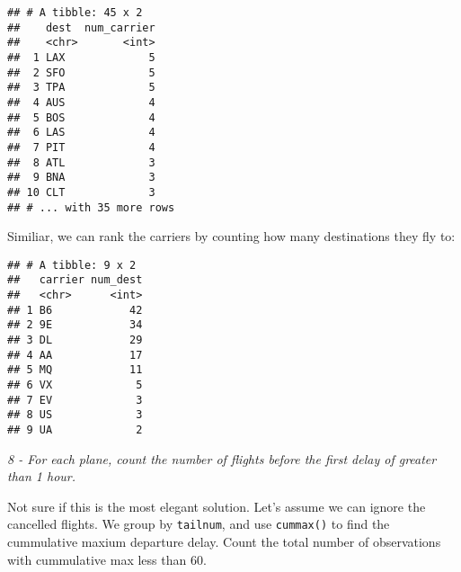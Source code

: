 \documentclass[]{article}
\newenvironment{Shaded}{\begin{snugshade}}{\end{snugshade}}
\newcommand{\KeywordTok}[1]{\textcolor[rgb]{0.13,0.29,0.53}{\textbf{#1}}}
\newcommand{\DataTypeTok}[1]{\textcolor[rgb]{0.13,0.29,0.53}{#1}}
\newcommand{\DecValTok}[1]{\textcolor[rgb]{0.00,0.00,0.81}{#1}}
\newcommand{\StringTok}[1]{\textcolor[rgb]{0.31,0.60,0.02}{#1}}
\newcommand{\OperatorTok}[1]{\textcolor[rgb]{0.81,0.36,0.00}{\textbf{#1}}}
\newcommand{\NormalTok}[1]{#1}
\theoremstyle{definition}
\theoremstyle{definition}
\theoremstyle{definition}
\theoremstyle{remark}
\begin{document}
\begin{verbatim}
## # A tibble: 45 x 2
##    dest  num_carrier
##    <chr>       <int>
##  1 LAX             5
##  2 SFO             5
##  3 TPA             5
##  4 AUS             4
##  5 BOS             4
##  6 LAS             4
##  7 PIT             4
##  8 ATL             3
##  9 BNA             3
## 10 CLT             3
## # ... with 35 more rows
\end{verbatim}

Similiar, we can rank the carriers by counting how many destinations
they fly to:

\begin{Shaded}
\end{Shaded}

\begin{verbatim}
## # A tibble: 9 x 2
##   carrier num_dest
##   <chr>      <int>
## 1 B6            42
## 2 9E            34
## 3 DL            29
## 4 AA            17
## 5 MQ            11
## 6 VX             5
## 7 EV             3
## 8 US             3
## 9 UA             2
\end{verbatim}

\emph{8 - For each plane, count the number of flights before the first
delay of greater than 1 hour.}

Not sure if this is the most elegant solution. Let's assume we can
ignore the cancelled flights. We group by \texttt{tailnum}, and use
\texttt{cummax()} to find the cummulative maxium departure delay. Count
the total number of observations with cummulative max less than 60.

\begin{Shaded}
\end{Shaded}
\end{document}
